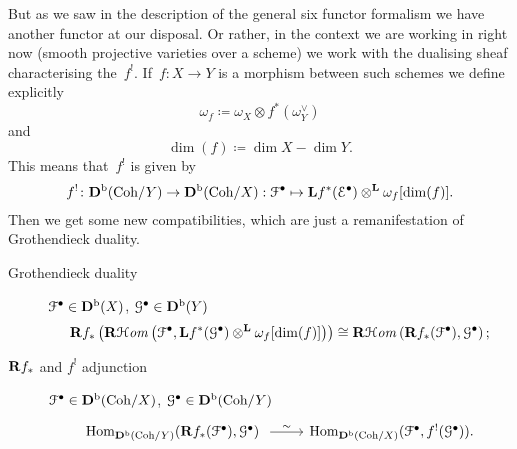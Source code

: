 \documentclass[10pt,a4paper]{article}
\begin{document}
But as we saw in the description of the general six functor formalism we have another functor at our disposal. Or rather, in the context we are working in right now (smooth projective varieties over a scheme) we work with the dualising sheaf characterising the~$f^!$. If~$f\colon X\to Y$ is a morphism between such schemes we define explicitly
\begin{equation}
  \omega_f\coloneqq\omega_X\otimes f^*(\omega_Y^\vee)
\end{equation}
and
\begin{equation}
  \dim(f)\coloneqq\dim X-\dim Y.
\end{equation}
This means that~$f^!$ is given by
\begin{equation}
  f^!\colon\mathbf{D}^{\mathrm{b}}(\mathrm{Coh}/Y)\to\mathbf{D}^{\mathrm{b}}(\mathrm{Coh}/X):\mathcal{F}^\bullet\mapsto\mathbf{L} f^*(\mathcal{E}^\bullet)\otimes^{\mathbf{L}}\omega_f[\dim(f)].
\end{equation}
Then we get some new compatibilities, which are just a remanifestation of Grothendieck duality.
\begin{description}
  \item[Grothendieck duality] $\mathcal{F}^\bullet\in\mathbf{D}^{\mathrm{b}}(X)$, $\mathcal{G}^\bullet\in\mathbf{D}^{\mathrm{b}}(Y)$
    \begin{equation}
      \mathbf{R} f_*\left( \operatorname{\mathbf{R}\mathcal{H}\mathit{om}}\left( \mathcal{F}^\bullet,\mathbf{L} f^*(\mathcal{G}^\bullet)\otimes^{\mathbf{L}}\omega_f[\dim(f)] \right) \right)\cong\operatorname{\mathbf{R}\mathcal{H}\mathit{om}}\left( \mathbf{R} f_*(\mathcal{F}^\bullet),\mathcal{G}^\bullet \right);
    \end{equation}
  \item[$\mathbf{R} f_*$ and $f^!$ adjunction] $\mathcal{F}^\bullet\in\mathbf{D}^{\mathrm{b}}(\mathrm{Coh}/X)$, $\mathcal{G}^\bullet\in\mathbf{D}^{\mathrm{b}}(\mathrm{Coh}/Y)$
    \begin{equation}
      \begin{tikzcd}
        \Hom_{\derived^\bounded(\Coh/Y)}(\RRR f_*(\mathcal{F}^\bullet),\mathcal{G}^\bullet) \arrow{r}{\sim} & \Hom_{\derived^\bounded(\Coh/X)}(\mathcal{F}^\bullet,f^!(\mathcal{G}^\bullet)).
      \end{tikzcd}
    \end{equation}
\end{description}
\end{document}
